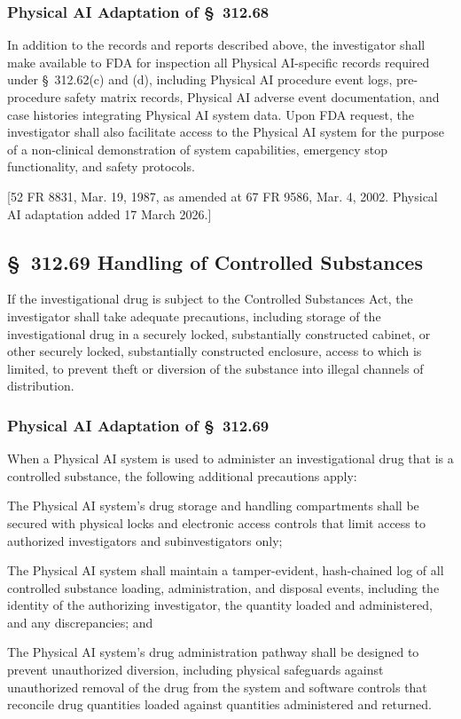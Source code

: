 \subsubsection{Physical AI Adaptation of \S~312.68}

In addition to the records and reports described above, the investigator shall make available to FDA for inspection all Physical AI-specific records required under \S~312.62(c) and (d), including Physical AI procedure event logs, pre-procedure safety matrix records, Physical AI adverse event documentation, and case histories integrating Physical AI system data. Upon FDA request, the investigator shall also facilitate access to the Physical AI system for the purpose of a non-clinical demonstration of system capabilities, emergency stop functionality, and safety protocols.

[52 FR 8831, Mar. 19, 1987, as amended at 67 FR 9586, Mar. 4, 2002. Physical AI adaptation added 17 March 2026.]

\subsection{\S~312.69 Handling of Controlled Substances}

If the investigational drug is subject to the Controlled Substances Act, the investigator shall take adequate precautions, including storage of the investigational drug in a securely locked, substantially constructed cabinet, or other securely locked, substantially constructed enclosure, access to which is limited, to prevent theft or diversion of the substance into illegal channels of distribution.

\subsubsection{Physical AI Adaptation of \S~312.69}

When a Physical AI system is used to administer an investigational drug that is a controlled substance, the following additional precautions apply:

\begin{description}[leftmargin=0.8cm,style=sameline]
\item[(a)] The Physical AI system's drug storage and handling compartments shall be secured with physical locks and electronic access controls that limit access to authorized investigators and subinvestigators only;
\item[(b)] The Physical AI system shall maintain a tamper-evident, hash-chained log of all controlled substance loading, administration, and disposal events, including the identity of the authorizing investigator, the quantity loaded and administered, and any discrepancies; and
\item[(c)] The Physical AI system's drug administration pathway shall be designed to prevent unauthorized diversion, including physical safeguards against unauthorized removal of the drug from the system and software controls that reconcile drug quantities loaded against quantities administered and returned.
\end{description}

